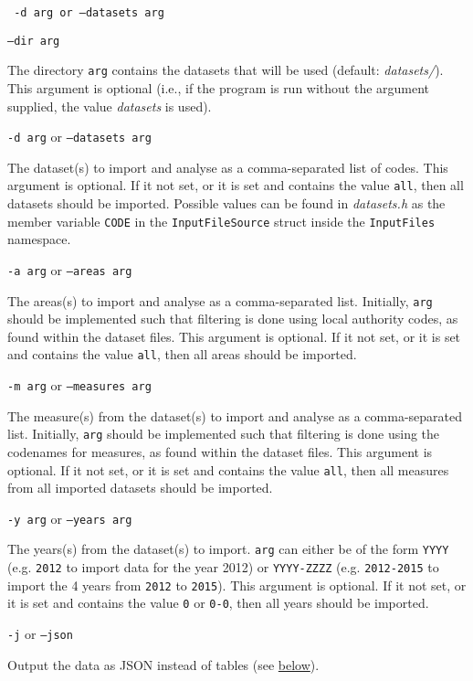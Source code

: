 \documentclass[a4paper]{article}
\begin{document}
\begin{labeling}{\texttt{ -d arg or --datasets arg}}
    \item[\texttt{--dir arg}]

    The directory \texttt{arg} contains the datasets that will be used (default: \emph{datasets/}). This argument is optional (i.e., if the program is run without the argument supplied, the value \emph{datasets} is used).

    \item[\texttt{-d arg} or \texttt{--datasets arg}]

    The dataset(s) to import and analyse as a comma-separated list of codes. This argument is optional. If it not set, or it is set  and contains the value \texttt{all}, then all datasets should be imported. Possible values can be found in \emph{datasets.h} as the member variable \texttt{CODE} in the \texttt{InputFileSource} struct inside the \texttt{InputFiles} namespace.

    \item[\texttt{-a arg} or \texttt{--areas arg}]

    The areas(s) to import and analyse as a comma-separated list. Initially, \texttt{arg} should be implemented such that filtering is done using local authority codes, as found within the dataset files. This argument is optional. If it not set, or it is set  and contains the value \texttt{all}, then all areas should be imported.

    \item[\texttt{-m arg} or \texttt{--measures arg}]

    The measure(s) from the dataset(s) to import and analyse as a comma-separated list. Initially, \texttt{arg} should be implemented such that filtering is done using the codenames for measures, as found within the dataset files. This argument is optional. If it not set, or it is set and contains the value \texttt{all}, then all measures from all imported datasets should be imported.

    \item[\texttt{-y arg} or \texttt{--years arg}]

    The years(s) from the dataset(s) to import. \texttt{arg} can either be of the form \texttt{YYYY} (e.g. \texttt{2012} to import data for the year 2012) or \texttt{YYYY-ZZZZ} (e.g. \texttt{2012-2015} to import the 4 years from \texttt{2012} to \texttt{2015}). This argument is optional. If it not set, or it is set and contains the value \texttt{0} or \texttt{0-0}, then all years should be imported.

    \item[\texttt{-j} or \texttt{--json}]

    Output the data as JSON instead of tables (see \hyperref[sec:cwk output]{below}).
\end{labeling}
\end{document}
